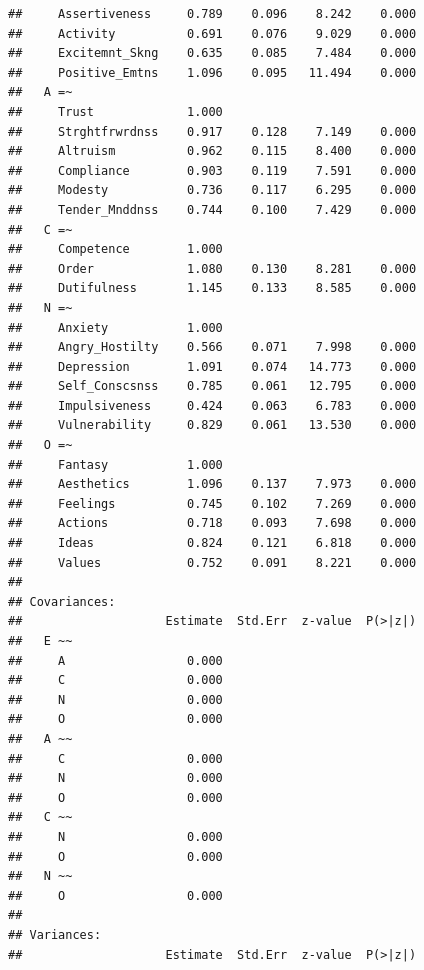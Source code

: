 \documentclass{article}\usepackage[]{graphicx}\usepackage[]{color}
\makeatletter
\newenvironment{kframe}{%
 \def\at@end@of@kframe{}%
 \ifinner\ifhmode%
  \def\at@end@of@kframe{\end{minipage}}%
  \begin{minipage}{\columnwidth}%
 \fi\fi%
 \def\FrameCommand##1{\hskip\@totalleftmargin \hskip-\fboxsep
 \colorbox{shadecolor}{##1}\hskip-\fboxsep
     \hskip-\linewidth \hskip-\@totalleftmargin \hskip\columnwidth}%
 \MakeFramed {\advance\hsize-\width
   \@totalleftmargin\z@ \linewidth\hsize
   \@setminipage}}%
 {\par\unskip\endMakeFramed%
 \at@end@of@kframe}
\newenvironment{knitrout}{}{} %
\makeatother
\begin{document}
\begin{knitrout}
\begin{kframe}
\begin{verbatim}
##     Assertiveness     0.789    0.096    8.242    0.000
##     Activity          0.691    0.076    9.029    0.000
##     Excitemnt_Skng    0.635    0.085    7.484    0.000
##     Positive_Emtns    1.096    0.095   11.494    0.000
##   A =~                                                
##     Trust             1.000                           
##     Strghtfrwrdnss    0.917    0.128    7.149    0.000
##     Altruism          0.962    0.115    8.400    0.000
##     Compliance        0.903    0.119    7.591    0.000
##     Modesty           0.736    0.117    6.295    0.000
##     Tender_Mnddnss    0.744    0.100    7.429    0.000
##   C =~                                                
##     Competence        1.000                           
##     Order             1.080    0.130    8.281    0.000
##     Dutifulness       1.145    0.133    8.585    0.000
##   N =~                                                
##     Anxiety           1.000                           
##     Angry_Hostilty    0.566    0.071    7.998    0.000
##     Depression        1.091    0.074   14.773    0.000
##     Self_Conscsnss    0.785    0.061   12.795    0.000
##     Impulsiveness     0.424    0.063    6.783    0.000
##     Vulnerability     0.829    0.061   13.530    0.000
##   O =~                                                
##     Fantasy           1.000                           
##     Aesthetics        1.096    0.137    7.973    0.000
##     Feelings          0.745    0.102    7.269    0.000
##     Actions           0.718    0.093    7.698    0.000
##     Ideas             0.824    0.121    6.818    0.000
##     Values            0.752    0.091    8.221    0.000
## 
## Covariances:
##                    Estimate  Std.Err  z-value  P(>|z|)
##   E ~~                                                
##     A                 0.000                           
##     C                 0.000                           
##     N                 0.000                           
##     O                 0.000                           
##   A ~~                                                
##     C                 0.000                           
##     N                 0.000                           
##     O                 0.000                           
##   C ~~                                                
##     N                 0.000                           
##     O                 0.000                           
##   N ~~                                                
##     O                 0.000                           
## 
## Variances:
##                    Estimate  Std.Err  z-value  P(>|z|)

\end{verbatim}
\end{kframe}
\end{knitrout}
\end{document}
